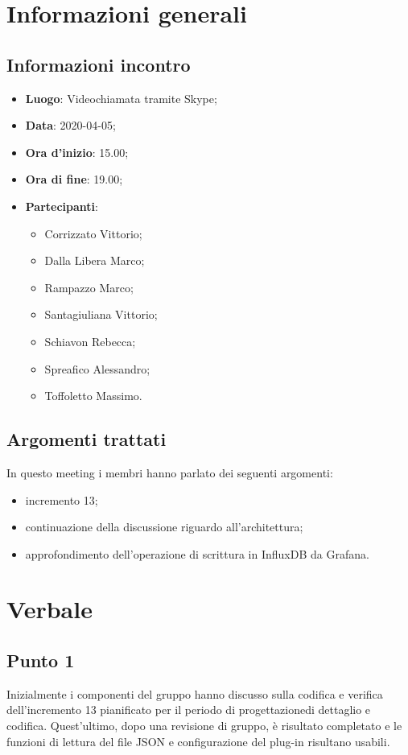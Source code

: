\section{Informazioni generali}
    \subsection{Informazioni incontro}
        \begin{itemize}
            \item \textbf{Luogo}: Videochiamata tramite Skype;
            \item \textbf{Data}: 2020-04-05;
            \item \textbf{Ora d'inizio}: 15.00;
            \item \textbf{Ora di fine}: 19.00;
            \item \textbf{Partecipanti}: \begin{itemize}
                \item Corrizzato Vittorio;
                \item Dalla Libera Marco;
                \item Rampazzo Marco;
                \item Santagiuliana Vittorio;
                \item Schiavon Rebecca;
                \item Spreafico Alessandro;
                \item Toffoletto Massimo.
            \end{itemize}
        \end{itemize}
    \subsection{Argomenti trattati}
        In questo meeting i membri hanno parlato dei seguenti argomenti:
        \begin{itemize}
            \item incremento 13;
            \item continuazione della discussione riguardo all'architettura;
            \item approfondimento dell'operazione di scrittura in InfluxDB da Grafana\glo.
        \end{itemize}
\section{Verbale}
    \subsection{Punto 1}
        Inizialmente i componenti del gruppo hanno discusso sulla codifica e verifica dell'incremento 13 pianificato per il periodo di progettazione\glosp di dettaglio e codifica. Quest'ultimo, dopo una revisione di gruppo, è risultato completato e le funzioni di lettura del file JSON e configurazione del plug-in risultano usabili.
